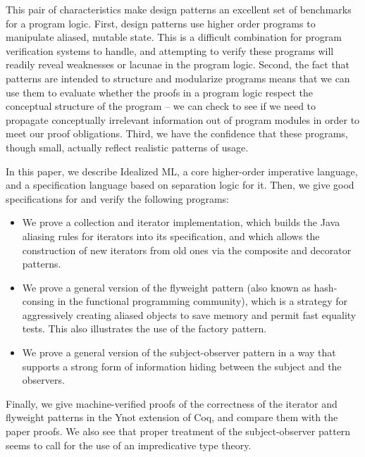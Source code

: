 \documentclass[preprint,natbib]{sigplanconf}
\begin{document}
This pair of characteristics make design patterns an excellent set of
benchmarks for a program logic.  First, design patterns use higher
order programs to manipulate aliased, mutable state. This is a
difficult combination for program verification systems to handle, and
attempting to verify these programs will readily reveal weaknesses or
lacunae in the program logic. Second, the fact that patterns are
intended to structure and modularize programs means that we can use
them to evaluate whether the proofs in a program logic respect the
conceptual structure of the program -- we can check to see if we need
to propagate conceptually irrelevant information out of program
modules in order to meet our proof obligations. Third, we have the
confidence that these programs, though small, actually reflect
realistic patterns of usage.

In this paper, we describe Idealized ML, a core higher-order
imperative language, and a specification language based on separation
logic for it. Then, we give good specifications for and verify the
following programs:

\begin{itemize}
\item We prove a collection and iterator implementation, which builds
  the Java aliasing rules for iterators into its specification, and
  which allows the construction of new iterators from old ones via the
  composite and decorator patterns.  

\item We prove a general version of the flyweight pattern (also known as
  hash-consing in the functional programming community), which is a
  strategy for aggressively creating aliased objects to save memory
  and permit fast equality tests. This also illustrates the use of the
  factory pattern.

\item We prove a general version of the subject-observer pattern in a
  way that supports a strong form of information hiding between the
  subject and the observers.
\end{itemize}

Finally, we give machine-verified proofs of the correctness of the
iterator and flyweight patterns in the Ynot extension of Coq, and
compare them with the paper proofs. We also see that proper treatment
of the subject-observer pattern seems to call for the use of an
impredicative type theory.
\end{document}
